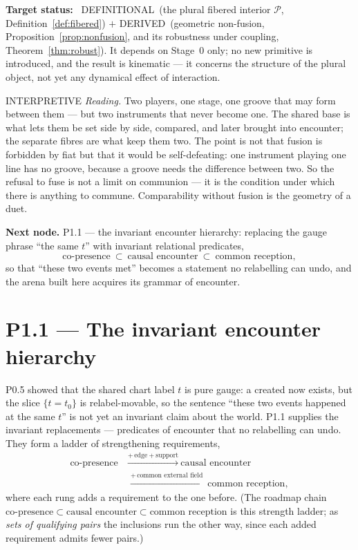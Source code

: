 \documentclass[11pt,a4paper]{article}
\newcommand{\stDerived}{\textcolor{cDer}{\textsf{\small DERIVED}}}
\newcommand{\stDef}{\textcolor{cDef}{\textsf{\small DEFINITIONAL}}}
\newcommand{\stInterp}{\textcolor{cInt}{\textsf{\small INTERPRETIVE}}}
\theoremstyle{definition}
\theoremstyle{plain}
\theoremstyle{remark}
\begin{document}
\textbf{Target status:}~
\stDef\ (the plural fibered interior \(\mathcal P\), Definition~\ref{def:fibered})
\(+\)
\stDerived\ (geometric non-fusion, Proposition~\ref{prop:nonfusion}, and its robustness
under coupling, Theorem~\ref{thm:robust}). It depends on Stage~0 only; no new primitive is
introduced, and the result is kinematic --- it concerns the structure of the plural
object, not yet any dynamical effect of interaction.

\medskip
\stInterp\quad
\emph{Reading.}
Two players, one stage, one groove that may form between them --- but two instruments that
never become one. The shared base is what lets them be set side by side, compared, and
later brought into encounter; the separate fibres are what keep them two. The point is not
that fusion is forbidden by fiat but that it would be self-defeating: one instrument
playing one line has no groove, because a groove needs the difference between two. So the
refusal to fuse is not a limit on communion --- it is the condition under which there is
anything to commune. Comparability without fusion is the geometry of a duet.

\medskip
\textbf{Next node.} P1.1 --- the invariant encounter hierarchy: replacing the gauge phrase
``the same \(t\)'' with invariant relational predicates,
\[
\text{co-presence}\ \subset\ \text{causal encounter}\ \subset\ \text{common reception},
\]
so that ``these two events met'' becomes a statement no relabelling can undo, and the
arena built here acquires its grammar of encounter.

\section{P1.1 --- The invariant encounter hierarchy}

P0.5 showed that the shared chart label \(t\) is pure gauge: a created now exists, but the
slice \(\{t=t_0\}\) is relabel-movable, so the sentence ``these two events happened at the
same \(t\)'' is not yet an invariant claim about the world. P1.1 supplies the invariant
replacements --- predicates of encounter that no relabelling can undo. They form a ladder
of strengthening requirements,
\[
\begin{aligned}
\text{co-presence}
&\ \xrightarrow{+\,\text{edge}+\text{support}}\
\text{causal encounter}\\
&\ \xrightarrow{+\,\text{common external field}}\
\text{common reception},
\end{aligned}
\]
where each rung adds a requirement to the one before. (The roadmap chain
\(\text{co-presence}\subset\text{causal encounter}\subset\text{common reception}\) is this
strength ladder; as \emph{sets of qualifying pairs} the inclusions run the other way, since
each added requirement admits fewer pairs.)
\end{document}
